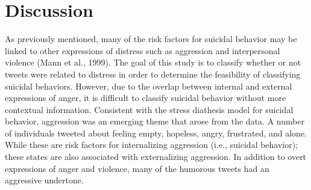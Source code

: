 \documentclass[11pt]{article}
\begin{document}

\section{Discussion}

As previously mentioned, many of the risk factors for suicidal behavior may be linked to other expressions of distress such as aggression and interpersonal violence (Mann et al., 1999).  The goal of this study is to classify whether or not tweets were related to distress in order to determine the feasibility of classifying suicidal behaviors.  However, due to the overlap between internal and external expressions of anger, it is difficult to classify suicidal behavior without more contextual information.  Consistent with the stress diathesis model for suicidal behavior, aggression was an emerging theme that arose from the data. A number of individuals tweeted about feeling empty, hopeless, angry, frustrated, and alone.  While these are risk factors for internalizing aggression (i.e., suicidal behavior); these states are also associated with externalizing aggression.  In addition to overt expressions of anger and violence, many of the humorous tweets had an aggressive undertone. 

\end{document}

